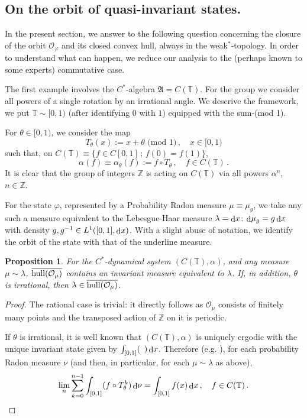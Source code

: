 \documentclass[12pt]{amsart}
\numberwithin{equation}{section}
\def\co{{\mathcal O}}
\def\ga{{\mathfrak A}} \def\gpa{{\mathfrak a}}
\def\bt{{\mathbb T}}
\def\bz{{\mathbb Z}}
\def\a{\alpha}
\def\l{\lambda} \def\L{\Lambda}
\def\m{\mu}
\def\n{\nu}
\def\f{\varphi}\def\ff{\phi} \def\F{\Phi}
\def\th{\theta}  \def\Th{\Theta}
\newtheorem{prop}[thm]{Proposition}
\def\di{\mathop{\rm d}\!}
\begin{document}
\subsection{On the orbit of quasi-invariant states.} 
\label{otof}

In the present section, we answer to the following question concerning the closure of the orbit $\co_\f$ and its closed convex hull, always in the weak${}^*$-topology. In order to understand what can happen, we reduce our analysis to the (perhaps known to some experts) commutative case.

The first example involves the $C^*$-algebra $\ga=C(\bt)$. For the group we consider all powers of a single rotation by an irrational angle. We descrive the framework, we put $\bt\sim[0,1)$ (after identifying $0$ with $1$) equipped with the sum-(mod 1). 

For $\th\in[0,1)$, we consider the map
$$
T_\th(x):=x+\th\,\,\text{(mod 1)}\,,\quad x\in[0,1)
$$ 
such that, on $C(\bt)\equiv\{f\in C[0,1]\,;\,f(0)=f(1)\}$, 
$$
\a(f)\equiv\a_\th(f):=f\circ T_\th\,,\quad f\in C(\bt)\,.
$$
It is clear that the group of integers $\bz$ is acting on $C(\bt)$ via all powers $\a^n$, $n\in\bz$.

For the state $\f$, represented by a Probability Radon measure $\m\equiv\m_g$, we take any such a measure 
equivalent to the Lebesgue-Haar measure $\l=\di x$: $\di\m_g=g\di x$ with density $g,g^{-1}\in L^1([0,1],\di x)$.
With a slight abuse of notation, we identify the orbit of the state with that of the underline measure.
\begin{prop}
For the $C^*$-dynamical system $(C(\bt),\a)$, and any measure $\m\sim\l$, $\overline{{\rm hull}(\co_\m)}$ contains an invariant measure equivalent to $\l$. If, in addition, $\th$ is irrational, then $\l\in\overline{{\rm hull}(\co_\m)}$.
\end{prop}
\begin{proof}
The rational case is trivial: it directly follows as $\co_\m$ consists of finitely many points and the transposed action of $\bz$ on it is periodic.

If $\th$ is irrational, it is well known that $(C(\bt),\a)$ is uniquely ergodic with the unique invariant state given by $
\int_{[0,1]}(\,\,\,) \di x$. Therefore (e.g. \cite{Fier}), for each probability Radon measure $\n$ (and then, in particular, for each $\m\sim\l$ as above), 
$$
\lim_n\sum_{k=0}^{n-1}\int_{[0,1]} (f\circ T^k_\th)\di\n=\int_{[0,1]} f(x)\di x\,,\quad f\in C(\bt)\,.
$$
\end{proof}
\end{document}
